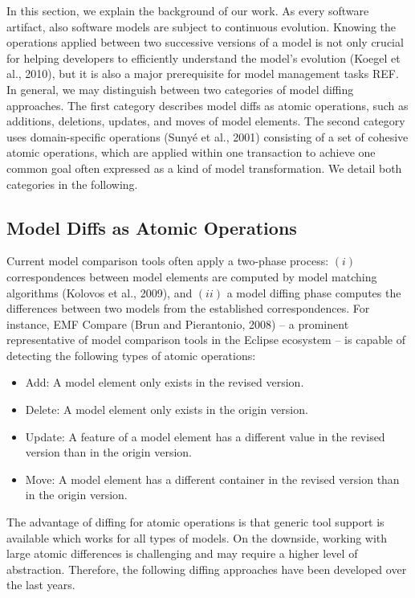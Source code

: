 In this section, we explain the background of our work. As every software artifact, also software models are subject to continuous evolution. Knowing the operations applied between two successive versions of a model is not only crucial for helping developers to efficiently understand the model's evolution (Koegel et al., 2010), but it is also a major prerequisite for model management tasks REF. In general, we may distinguish between two categories of model diffing approaches. The first category describes model diffs as atomic operations, such as additions, deletions, updates, and moves of model elements. The second category uses domain-specific operations (Sunyé et al., 2001) consisting of a set of cohesive atomic operations, which are applied within one transaction to achieve one common goal often expressed as a kind of model transformation. We detail both categories in the following.

\subsection{Model Diffs as Atomic Operations}

Current model comparison tools often apply a two-phase process: $(i)$ correspondences between model elements are computed by model matching algorithms (Kolovos et al., 2009), and $(ii)$ a model diffing phase computes the differences between two models from the established correspondences. For instance, EMF Compare (Brun and Pierantonio, 2008) – a prominent representative of model comparison tools in the Eclipse ecosystem – is capable of detecting the following types of atomic operations:

\begin{itemize}
  \item Add: A model element only exists in the revised version.
  \item Delete: A model element only exists in the origin version.
  \item Update: A feature of a model element has a different value in the revised version than in the origin version.
  \item Move: A model element has a different container in the revised version than in the origin version.
\end{itemize}

The advantage of diffing for atomic operations is that generic tool support is available which works for all types of models. On the downside, working with large atomic differences is challenging and may require a higher level of abstraction. Therefore, the following diffing approaches have been developed over the last years. 


